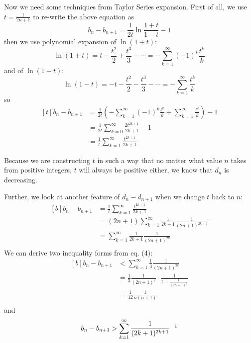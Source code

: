 \documentclass[11pt]{article}
\begin{document}
Now we need some techniques from Taylor Series expansion.  First of all,  we use $t= \displaystyle  \frac{1}{2n+1}$ to re-write the above equation as
$$ b_n - b_{n+1} = \frac{1}{2t} \ln \frac{1+t}{1-t} -1 $$
then we use polynomial expansion of $\ln (1+t)$:
$$ \ln (1+t) = t - \frac{t^2}{2} + \frac{t^3}{3} - \cdots =  - \sum _{k=1} ^\infty (-1)^k \frac{t^k}{k} $$
and of $\ln (1-t)$:
$$ \ln (1-t) = -t -  \frac{t^2}{2} - \frac{t^3}{3} - \cdots = - \sum _{k=1} ^\infty \frac{t^k}{k} $$
so
$$
\begin{aligned}[t]
 b_n - b_{n+1} 
 	&= \frac{1}{2t} \left(  - \sum _{k=1} ^\infty (-1)^k \frac{t^k}{k} +  \sum _{k=1} ^\infty \frac{t^k}{k} \right) -1 \\
 	&= \frac{1}{2t} \sum _{k=0} ^\infty \frac{2t^{2k+1}} {2k+1}  -1 \\
	&=  \frac{1}{t} \sum _{k=1} ^\infty \frac{t^{2k+1}} {2k+1} 
\end{aligned}
$$


Because we are constructing $t$ in such a way that no matter what value $n$ takes from positive integers, $t$ will always be positive either,  we know that $d_n$ is decreasing.  

Further,  we look at another feature of $d_n - d_{n+1}$ when we change $t$ back to $n$:
\begin{equation}
\begin{aligned}[b]
 b_n - b_{n+1} 
 	&= \frac{1}{t} \sum _{k=1} ^\infty \frac{t^{2k+1}} {2k+1} \\
	&= (2n + 1) \sum _{k=1} ^\infty \frac{1} {2k+1} \frac{1}{(2n+1)^{2k+1}} \\ 	
	&= \sum _{k=1} ^\infty \frac{1} {2k+1} \frac{1}{(2n+1)^{2k}} \\ 
\end{aligned}
\end{equation}
We can derive two inequality forms from eq. (4):
$$
\begin{aligned}[b]
 b_n - b_{n+1} 
 	&<  \sum _{k=1} ^\infty \frac{1}{3} \frac{1}{(2n+1)^{2k}} \\ 
	&= \frac{1}{3} \frac{1}{(2n+1)^{2}} \cdot \frac{1}{ 1 - \frac {1} {(2n+1)^2} } \\
	&= \frac{1}{12} \frac{1}{n(n+1)} \\
\end{aligned}
$$
and
$$
\begin{aligned}[b]
 b_n - b_{n+1} 
 	&>  \sum _{k=1} ^\infty \frac{1}{(2k+1)^{2k+1}}  \ \ \footnotemark \\ 
\end{aligned}
$$
\end{document}
